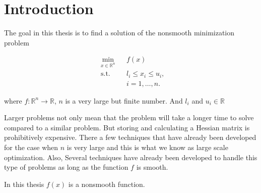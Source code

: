 
\chapter{Introduction} %

\label{Chapter1} %


The goal in this thesis is to find a solution of the nonsmooth minimization problem

\begin{equation} \label{mainproblem}
  \begin{aligned}
    & \underset{x \in \mathbb{R}^n}{\text{min}}
    & & f(x) \\
    & \text{s.t.}
    & & l_i \leq x_i \leq u_i , \; \\
    & & & i = 1, \ldots, n.
  \end{aligned}
\end{equation}

where $f \colon \mathbb{R}^n \to \mathbb{R}$, $n$ is a very large but finite number. And $l_i$ and $u_i \in \mathbb{R}$

Larger problems not only mean that the problem will take a longer time to solve compared to a similar problem. But storing and calculating a Hessian matrix is prohibitively expensive. There a few techniques that have already been developed for the case when $n$ is very large and this is what we know as large scale optimization. Also, Several techniques have already been developed to handle this type of problems as long as the function $f$ is smooth. 

In this thesis $f(x)$ is a nonsmooth function.

